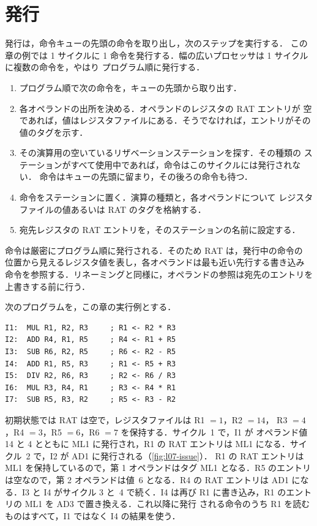 \documentclass[../main.tex]{subfiles}
\begin{document}
\section{発行}
\label{sec:l07-issue}

発行は，命令キューの先頭の命令を取り出し，次のステップを実行する．
この章の例では 1 サイクルに
1 命令を発行する．幅の広いプロセッサは 1 サイクルに複数の命令を，やはり
プログラム順に発行する．
\begin{enumerate}
  \item プログラム順で次の命令を，キューの先頭から取り出す．
  \item 各オペランドの出所を決める．オペランドのレジスタの RAT エントリが
    空であれば，値はレジスタファイルにある．そうでなければ，エントリがその
    値のタグを示す．
  \item その演算用の空いているリザベーションステーションを探す．その種類の
    ステーションがすべて使用中であれば，命令はこのサイクルには発行されない．
    命令はキューの先頭に留まり，その後ろの命令も待つ．
  \item 命令をステーションに置く．演算の種類と，各オペランドについて
    レジスタファイルの値あるいは RAT のタグを格納する．
  \item 宛先レジスタの RAT エントリを，そのステーションの名前に設定する．
\end{enumerate}

命令は厳密にプログラム順に発行される．そのため RAT は，発行中の命令の
位置から見えるレジスタ値を表し，各オペランドは最も近い先行する書き込み
命令を参照する．リネーミングと同様に，オペランドの参照は宛先のエントリを
上書きする前に行う．

\begin{example}
  \label{ex:l07-program}
  次のプログラムを，この章の実行例とする．
  \begin{lstlisting}[language={[x86masm]Assembler}, numbers=none]
I1:  MUL R1, R2, R3     ; R1 <- R2 * R3
I2:  ADD R4, R1, R5     ; R4 <- R1 + R5
I3:  SUB R6, R2, R5     ; R6 <- R2 - R5
I4:  ADD R1, R5, R3     ; R1 <- R5 + R3
I5:  DIV R2, R6, R3     ; R2 <- R6 / R3
I6:  MUL R3, R4, R1     ; R3 <- R4 * R1
I7:  SUB R5, R3, R2     ; R5 <- R3 - R2
\end{lstlisting}
  初期状態では RAT は空で，レジスタファイルは R1 $=1$，R2 $=14$，
  R3 $=4$，R4 $=3$，R5 $=6$，R6 $=7$ を保持する．サイクル~1 で，I1 が
  オペランド値 14 と 4 とともに ML1 に発行され，R1 の RAT エントリは ML1
  になる．サイクル~2 で，I2 が AD1 に発行される（\cref{fig:l07-issue}）．
  R1 の RAT エントリは ML1 を保持しているので，第 1 オペランドはタグ ML1
  となる．R5 のエントリは空なので，第 2 オペランドは値~6 となる．R4 の
  RAT エントリは AD1 になる．I3 と I4 がサイクル 3 と~4 で続く．I4 は再び
  R1 に書き込み，R1 のエントリの ML1 を AD3 で置き換える．これ以降に発行
  される命令のうち R1 を読むものはすべて，I1 ではなく I4 の結果を使う．
\end{example}
\end{document}

